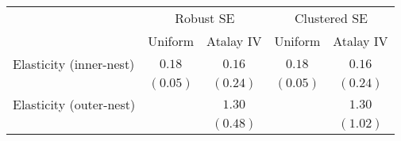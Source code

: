 
\begin{tabular}{l c c c c}
\hline
 & \multicolumn{2}{c}{Robust SE} & \multicolumn{2}{c}{Clustered SE} \\
\cline{2-3} \cline{4-5}
 & Uniform & Atalay IV & Uniform & Atalay IV \\
\hline
Elasticity (inner-nest) & $0.18$   & $0.16$   & $0.18$   & $0.16$   \\
                        & $(0.05)$ & $(0.24)$ & $(0.05)$ & $(0.24)$ \\
Elasticity (outer-nest) &          & $1.30$   &          & $1.30$   \\
                        &          & $(0.48)$ &          & $(1.02)$ \\
\hline
\end{tabular}
